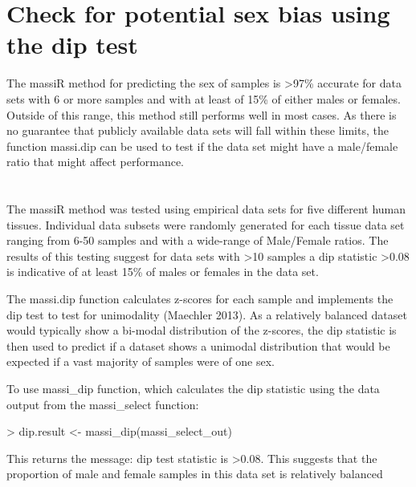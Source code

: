 \documentclass{article}
\begin{document}
\clearpage

\section{Check for potential sex bias using the dip test}
The massiR method for predicting the sex of samples is >97\% accurate for data sets with 6 or more samples and with at least of 15\% of either males or females. Outside of this range, this method still performs well in most cases. As there is no guarantee that publicly available data sets will fall within these limits, the function massi.dip can be used to test if the data set might have a male/female ratio that might affect performance. 
\paragraph{} \hspace{0pt} \\
The massiR method was tested using empirical data sets for five different human tissues. Individual data subsets were randomly generated for each tissue data set ranging from 6-50 samples and with a wide-range of  Male/Female ratios. The results of this testing suggest for data sets with >10 samples a dip statistic  >0.08 is indicative of at least 15\% of males or females in the data set.

The massi.dip function calculates z-scores for each sample and implements the dip test to test for unimodality (Maechler 2013). As a relatively balanced dataset would typically show a bi-modal distribution of the z-scores, the dip statistic is then used to predict if a dataset shows a unimodal distribution that would  be expected if a vast majority of samples were of one sex.

To use massi_dip function, which calculates the dip statistic using the data output from the massi_select function:
\begin{Schunk}
\begin{Sinput}
> dip.result <- massi_dip(massi_select_out)
\end{Sinput}
\end{Schunk}

This returns the message:
{\color{red}dip test statistic is >0.08. This suggests that the proportion of male and female samples in this data set is relatively balanced}
\paragraph{} \hspace{0pt} \\
\end{document}

